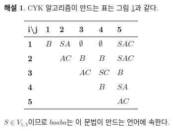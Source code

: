 \documentclass[b5paper, 11pt]{book}
\theoremstyle{definition}
\newtheorem*{ans*}{해설}
\begin{document}
\begin{ans*}
    CYK 알고리즘이 만드는 표는 그림 \ref{CYK example}과 같다.
    \begin{figure}[!ht]
        \centering
        \begin{tabular}{l|lllll}
        \textbf{i\textbackslash j} & \textbf{1} & \textbf{2} & \textbf{3} & \textbf{4} & \textbf{5} \\ \hline
        \textbf{1} & $B$ & $SA$ & $\emptyset$ & $\emptyset$ & $SAC$ \\
        \textbf{2} &  & $AC$ & $B $&$ B$ & $SAC$ \\
        \textbf{3} &  &  & $AC$ & $SC$ & $B$ \\
        \textbf{4} &  &  &  & $B$ & $SA$ \\
        \textbf{5} &  &  &  &  & $AC$
        \end{tabular}
        \caption{}
        \label{CYK example}
    \end{figure}
    $S \in V_{1,5}$이므로 $baaba$는 이 문법이 만드는 언어에 속한다.
\end{ans*}
\end{document}
